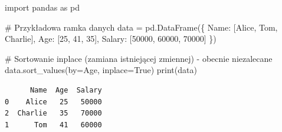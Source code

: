 \documentclass[
  polish,
  letterpaper,
  DIV=11,
  numbers=noendperiod]{scrreprt}
\newenvironment{Shaded}{\begin{snugshade}}{\end{snugshade}}
\newcommand{\BuiltInTok}[1]{\textcolor[rgb]{0.00,0.23,0.31}{#1}}
\newcommand{\CommentTok}[1]{\textcolor[rgb]{0.37,0.37,0.37}{#1}}
\newcommand{\DecValTok}[1]{\textcolor[rgb]{0.68,0.00,0.00}{#1}}
\newcommand{\ImportTok}[1]{\textcolor[rgb]{0.00,0.46,0.62}{#1}}
\newcommand{\NormalTok}[1]{\textcolor[rgb]{0.00,0.23,0.31}{#1}}
\newcommand{\OperatorTok}[1]{\textcolor[rgb]{0.37,0.37,0.37}{#1}}
\newcommand{\StringTok}[1]{\textcolor[rgb]{0.13,0.47,0.30}{#1}}
\newcommand{\VariableTok}[1]{\textcolor[rgb]{0.07,0.07,0.07}{#1}}
\begin{document}
\begin{Shaded}
\begin{Highlighting}[]
\ImportTok{import}\NormalTok{ pandas }\ImportTok{as}\NormalTok{ pd}

\CommentTok{\# Przykładowa ramka danych}
\NormalTok{data }\OperatorTok{=}\NormalTok{ pd.DataFrame(\{}
    \StringTok{\textquotesingle{}Name\textquotesingle{}}\NormalTok{: [}\StringTok{\textquotesingle{}Alice\textquotesingle{}}\NormalTok{, }\StringTok{\textquotesingle{}Tom\textquotesingle{}}\NormalTok{, }\StringTok{\textquotesingle{}Charlie\textquotesingle{}}\NormalTok{],}
    \StringTok{\textquotesingle{}Age\textquotesingle{}}\NormalTok{: [}\DecValTok{25}\NormalTok{, }\DecValTok{41}\NormalTok{, }\DecValTok{35}\NormalTok{],}
    \StringTok{\textquotesingle{}Salary\textquotesingle{}}\NormalTok{: [}\DecValTok{50000}\NormalTok{, }\DecValTok{60000}\NormalTok{, }\DecValTok{70000}\NormalTok{]}
\NormalTok{\})}

\CommentTok{\# Sortowanie inplace (zamiana istniejącej zmiennej) {-} obecnie niezalecane}
\NormalTok{data.sort\_values(by}\OperatorTok{=}\StringTok{\textquotesingle{}Age\textquotesingle{}}\NormalTok{, inplace}\OperatorTok{=}\VariableTok{True}\NormalTok{)}
\BuiltInTok{print}\NormalTok{(data)}
\end{Highlighting}
\end{Shaded}

\begin{verbatim}
      Name  Age  Salary
0    Alice   25   50000
2  Charlie   35   70000
1      Tom   41   60000
\end{verbatim}
\end{document}
